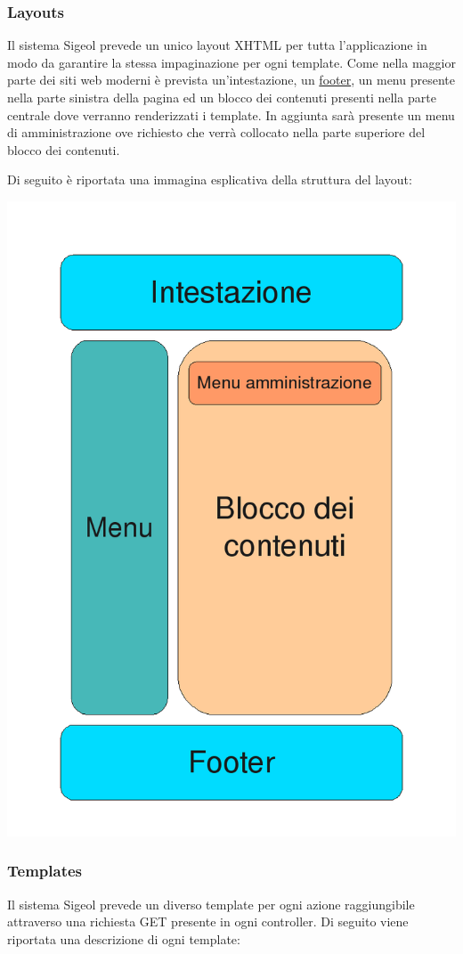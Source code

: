 \documentclass[11pt,a4paper]{article}
\begin{document}
\subsubsection{Layouts}
Il sistema Sigeol prevede un unico layout XHTML per tutta l'applicazione in modo da garantire la stessa impaginazione per ogni template. Come nella maggior parte dei siti web moderni è prevista un'intestazione, un \underline{footer}, un menu presente nella parte sinistra della pagina ed un blocco dei contenuti presenti nella parte centrale dove verranno renderizzati i template. In aggiunta sarà presente un menu di amministrazione ove richiesto che verrà collocato nella parte superiore del blocco dei contenuti.

Di seguito è riportata una immagina esplicativa della struttura del layout:

\includegraphics[scale=0.50]{images/layout.png}
\subsubsection{Templates}
Il sistema Sigeol prevede un diverso template per ogni azione raggiungibile attraverso una richiesta GET presente in ogni controller. Di seguito viene riportata una descrizione di ogni template:
\end{document}
